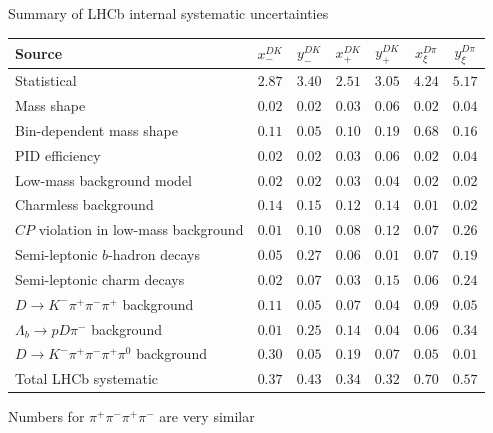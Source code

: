 \documentclass[xcolor={dvipsnames}]{beamer}
\begin{document}
\begin{frame}{Summary of LHCb internal systematic uncertainties}
  \scriptsize
  \vspace{0.02cm}
  \begin{center}
    \begin{tabular}{lcccccc}
      \hline
      Source & $x_-^{DK}$ & $y_-^{DK}$ & $x_+^{DK}$ & $y_+^{DK}$ & $x_\xi^{D\pi}$ & $y_\xi^{D\pi}$ \\
      \hline
      Statistical                                                & $2.87$ & $3.40$ & $2.51$ & $3.05$ & $4.24$ & $5.17$ \\
      \hline
      Mass shape                                                 & $0.02$ & $0.02$ & $0.03$ & $0.06$ & $0.02$ & $0.04$ \\
      Bin-dependent mass shape                                   & $0.11$ & $0.05$ & $0.10$ & $0.19$ & $0.68$ & $0.16$ \\
      PID efficiency                                             & $0.02$ & $0.02$ & $0.03$ & $0.06$ & $0.02$ & $0.04$ \\
      Low-mass background model                                  & $0.02$ & $0.02$ & $0.03$ & $0.04$ & $0.02$ & $0.02$ \\
      Charmless background                                       & $0.14$ & $0.15$ & $0.12$ & $0.14$ & $0.01$ & $0.02$ \\
      $C\!P$ violation in low-mass background                    & $0.01$ & $0.10$ & $0.08$ & $0.12$ & $0.07$ & $0.26$ \\
      Semi-leptonic $b$-hadron decays                            & $0.05$ & $0.27$ & $0.06$ & $0.01$ & $0.07$ & $0.19$ \\
      Semi-leptonic charm decays                                 & $0.02$ & $0.07$ & $0.03$ & $0.15$ & $0.06$ & $0.24$ \\
      $D\to K^-\pi^+\pi^-\pi^+$ background                       & $0.11$ & $0.05$ & $0.07$ & $0.04$ & $0.09$ & $0.05$ \\
      $\Lambda_b\to pD\pi^-$ background                          & $0.01$ & $0.25$ & $0.14$ & $0.04$ & $0.06$ & $0.34$ \\
      $D\to K^-\pi^+\pi^-\pi^+\pi^0$ background                  & $0.30$ & $0.05$ & $0.19$ & $0.07$ & $0.05$ & $0.01$ \\
      \hline
      Total LHCb systematic                                      & $0.37$ & $0.43$ & $0.34$ & $0.32$ & $0.70$ & $0.57$ \\
      \hline
    \end{tabular}
  \end{center}
  \vspace{0.2cm}
  \begin{center}
    {\normalsize Numbers for $\pi^+\pi^-\pi^+\pi^-$ are very similar}
  \end{center}
\end{frame}
\end{document}
